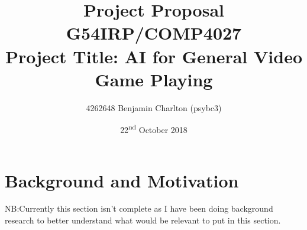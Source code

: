 \documentclass[a4paper]{article}
\begin{document}
\title{
    Project Proposal
    \\ \large{G54IRP/COMP4027}
    \\ \large{Project Title: AI for General Video Game Playing}\vspace{-3ex}}
\author{4262648 Benjamin Charlton (psybc3)}
\date{\vspace{-2ex}22\textsuperscript{nd} October 2018}
\maketitle

\section{Background and Motivation}
NB:\@ Currently this section isn't complete as I have been doing background research to better understand what would be relevant to put in this section.
\par
\pagebreak
\end{document}

